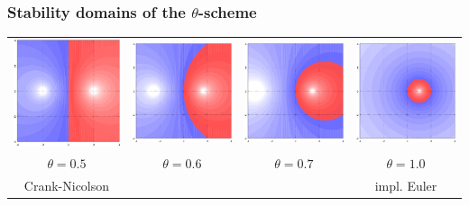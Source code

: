 \documentclass[USEnglish,ignorenonframetext,notheorems,aspectratio=1610]{beamer}
\begin{document}
\begin{frame}
  \frametitle{Stability domains of the $\theta$-scheme}
  \begin{center}
    \begin{tabular}{cccc}
      \includegraphics[width=.22\textwidth]{fig/stability-CR}
      &
      \includegraphics[width=.22\textwidth]{fig/stability-theta6}
      &
      \includegraphics[width=.22\textwidth]{fig/stability-theta7}
      &
      \includegraphics[width=.22\textwidth]{fig/stability-euler2}
      \\
      $\theta= 0.5$
      & $\theta = 0.6$
      & $\theta = 0.7$
      & $\theta = 1.0$
      \\
      Crank-Nicolson &&& impl. Euler
    \end{tabular}
  \end{center}
\end{frame}

\end{document}
